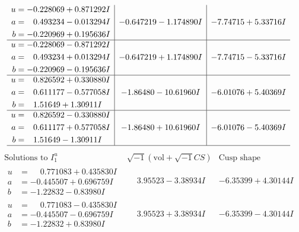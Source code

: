 \documentclass[1p]{elsarticle_modified}
\theoremstyle{definition}
\newcommand{\I}{\sqrt{-1}}
\begin{document}
$$\begin{array}{c|c|c}
\begin{aligned}
u &= -0.228069 + 0.871292 I \\
a &= \phantom{-}0.493234 - 0.013294 I \\
b &= -0.220969 + 0.195636 I\end{aligned}
 & -0.647219 - 1.174890 I & -7.74715 + 5.33716 I \\ \hline\begin{aligned}
u &= -0.228069 - 0.871292 I \\
a &= \phantom{-}0.493234 + 0.013294 I \\
b &= -0.220969 - 0.195636 I\end{aligned}
 & -0.647219 + 1.174890 I & -7.74715 - 5.33716 I \\ \hline\begin{aligned}
u &= \phantom{-}0.826592 + 0.330880 I \\
a &= \phantom{-}0.611177 - 0.577058 I \\
b &= \phantom{-}1.51649 + 1.30911 I\end{aligned}
 & -1.86480 - 10.61960 I & -6.01076 + 5.40369 I \\ \hline\begin{aligned}
u &= \phantom{-}0.826592 - 0.330880 I \\
a &= \phantom{-}0.611177 + 0.577058 I \\
b &= \phantom{-}1.51649 - 1.30911 I\end{aligned}
 & -1.86480 + 10.61960 I & -6.01076 - 5.40369 I\\
 \hline 
 \end{array}$$\newpage$$\begin{array}{c|c|c}  
\text{Solutions to }I^u_{1}& \I (\text{vol} + \sqrt{-1}CS) & \text{Cusp shape}\\
 \hline 
\begin{aligned}
u &= \phantom{-}0.771083 + 0.435830 I \\
a &= -0.445507 + 0.696759 I \\
b &= -1.22832 - 0.83980 I\end{aligned}
 & \phantom{-}3.95523 - 3.38934 I & -6.35399 + 4.30144 I \\ \hline\begin{aligned}
u &= \phantom{-}0.771083 - 0.435830 I \\
a &= -0.445507 - 0.696759 I \\
b &= -1.22832 + 0.83980 I\end{aligned}
 & \phantom{-}3.95523 + 3.38934 I & -6.35399 - 4.30144 I \\ \hline\begin{aligned}

\end{aligned}
\end{array}$$
\end{document}
